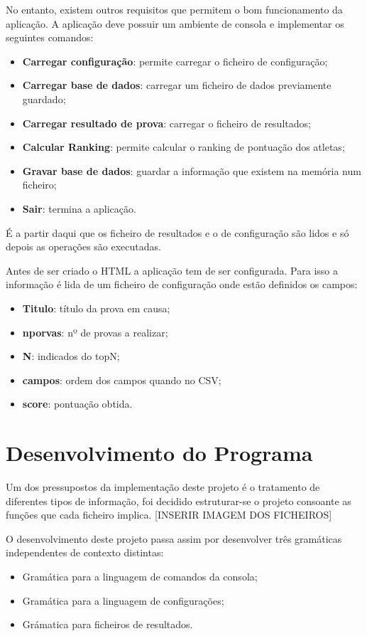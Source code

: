 \documentclass[11pt, a4paper, oneside]{article}
\begin{document}
No entanto, existem outros requisitos que permitem o bom funcionamento da aplicação. A aplicação deve possuir um ambiente de consola e implementar os seguintes comandos:
\begin{itemize}
\item \textbf{Carregar configuração}: permite carregar o ficheiro de configuração;
\item \textbf{Carregar base de dados}: carregar um ficheiro de dados previamente guardado;
\item \textbf{Carregar resultado de prova}: carregar o ficheiro de resultados;
\item \textbf{Calcular Ranking}: permite calcular o ranking de pontuação dos atletas;
\item \textbf{Gravar base de dados}: guardar a informação que existem na memória num ficheiro;
\item \textbf{Sair}: termina a aplicação.
\end{itemize}

É a partir daqui que os ficheiro de resultados e o de configuração são lidos e só depois as operações são executadas. 

Antes de ser criado o HTML a aplicação tem de ser configurada. Para isso a informação é lida de um ficheiro de configuração onde estão definidos os campos:
\begin{itemize}
\item \textbf{Titulo}: título da prova em causa;
\item \textbf{nporvas}: nº de provas a realizar;
\item \textbf{N}: indicados do topN;
\item \textbf{campos}: ordem dos campos quando no CSV;
\item \textbf{score}: pontuação obtida.
\end{itemize}

\newpage

\section{Desenvolvimento do Programa}
Um dos pressupostos da implementação deste projeto é o tratamento de diferentes tipos de informação, foi decidido estruturar-se o projeto consoante as funções que cada ficheiro implica.
[INSERIR IMAGEM DOS FICHEIROS]

O desenvolvimento deste projeto passa assim por desenvolver três gramáticas independentes de contexto distintas: 
\begin{itemize}
\item Gramática para a linguagem de comandos da consola; 
\item Gramática para a linguagem de configurações;
\item Grámatica para ficheiros de resultados. 
\end{itemize}
\end{document}
